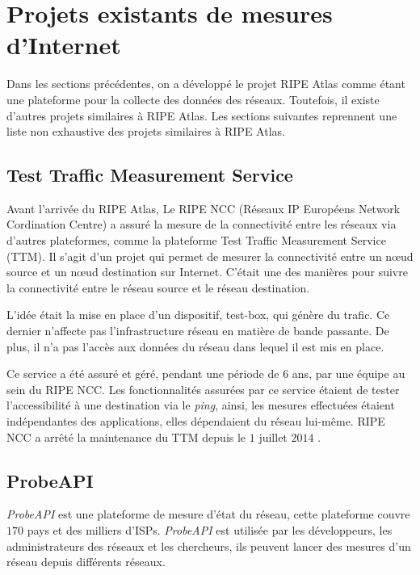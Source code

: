 

\section{Projets existants de mesures d'Internet}

Dans les sections précédentes, on a développé  le projet RIPE Atlas comme étant une plateforme pour la collecte des données des réseaux.  Toutefois, il existe d'autres projets similaires à RIPE Atlas. Les sections suivantes reprennent une liste non exhaustive des projets similaires  à RIPE Atlas.

\subsection{Test Traffic Measurement Service}

Avant l'arrivée du RIPE Atlas, Le RIPE NCC (Réseaux IP Européens Network Cordination Centre)   a assuré la mesure de la connectivité entre les réseaux via  d'autres plateformes, comme la plateforme Test Traffic Measurement Service (TTM). Il s'agit d'un projet qui permet de mesurer la connectivité entre un n\oe{}ud  source  et  un n\oe{}ud destination sur Internet.  C'était une des manières  pour  suivre la connectivité entre le réseau source et le réseau destination. 

L'idée était la mise en place d'un dispositif, test-box,  qui génère du trafic. Ce dernier n'affecte pas l'infrastructure réseau en matière de bande passante. De plus, il n'a pas l'accès aux données du réseau dans lequel il est mis en place.

Ce service a été assuré et géré, pendant une période de $6$ ans, par une équipe au sein du RIPE NCC. Les fonctionnalités assurées par ce service étaient de tester l'accessibilité à une destination via le \textit{ping}, ainsi, les mesures effectuées étaient indépendantes des applications, elles dépendaient du  réseau lui-même. RIPE NCC   a  arrêté la maintenance du  TTM depuis le $1$ juillet $2014$ \cite{TTM}.


\subsection{ProbeAPI}

\textit{ProbeAPI} \cite{PROBEAPI} est  une plateforme de mesure d'état  du réseau, cette plateforme couvre $170$ pays et des milliers d'ISPs. \textit{ProbeAPI} est utilisée par les développeurs, les administrateurs des réseaux et les chercheurs, ils peuvent lancer des mesures d'un réseau depuis différents réseaux.

